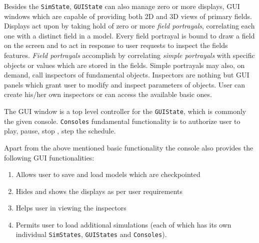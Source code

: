 Besides the \texttt{SimState}, \texttt{GUIState} can also manage zero or more displays, GUI windows which are capable of providing both 2D and 3D views of primary fields. Displays act upon by taking hold of zero or more \textit{field portrayals}, correlating each one with a distinct field in a model. Every field portrayal is bound to draw a field on the screen and to act in response to user requests to inspect the fields features. \textit{Field portrayals} accomplish by correlating \textit{simple portrayals} with specific objects or values which are stored in the fields. Simple portrayals may also, on demand, call inspectors of fundamental objects. Inspectors are nothing but GUI panels which grant user to modify and inspect parameters of objects. User can create his/her own inspectors or can access the available basic ones. 

The GUI window is a top level controller for the \texttt{GUIState}, which is commonly the given console. \texttt{Consoles} fundamental functionality is to authorize user to play, pause, stop , step the schedule. 

Apart from the above mentioned basic functionality the console also provides the following GUI functionalities: 
\begin{enumerate}
\item Allows user to save and load models which are checkpointed 
\item Hides and shows the displays as per user requirements
\item Helps user in viewing the inspectors 
\item Permits user to load additional simulations (each of which has its own individual \texttt{SimStates}, \texttt{GUIStates} and \texttt{Consoles}).
\end{enumerate}
\vspace{5mm}

